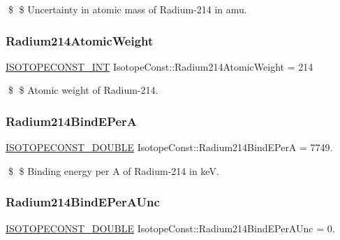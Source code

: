\$ \$ Uncertainty in atomic mass of Radium-\/214 in amu. \mbox{\label{group___isotope_const-_radium-_ra214_gaf2a700c6603025241d83a124c89c1779}} 
\subsubsection{\texorpdfstring{Radium214\+Atomic\+Weight}{Radium214AtomicWeight}}
{\footnotesize\ttfamily \mbox{\hyperlink{group___isotope_const-_macros_ga5f18360b3e99483a35c32d789e62621c}{I\+S\+O\+T\+O\+P\+E\+C\+O\+N\+S\+T\+\_\+\+I\+NT}} Isotope\+Const\+::\+Radium214\+Atomic\+Weight = 214}

\$ \$ Atomic weight of Radium-\/214. \mbox{\label{group___isotope_const-_radium-_ra214_gac9b581d3c4bf30c4f9dee54463287f96}} 
\subsubsection{\texorpdfstring{Radium214\+Bind\+E\+PerA}{Radium214BindEPerA}}
{\footnotesize\ttfamily \mbox{\hyperlink{group___isotope_const-_macros_ga8f45a7272ce02c0b4c65c44636ed719a}{I\+S\+O\+T\+O\+P\+E\+C\+O\+N\+S\+T\+\_\+\+D\+O\+U\+B\+LE}} Isotope\+Const\+::\+Radium214\+Bind\+E\+PerA = 7749.}

\$ \$ Binding energy per A of Radium-\/214 in keV. \mbox{\label{group___isotope_const-_radium-_ra214_gad258f7319f2012a423c6012f490d6af1}} 
\subsubsection{\texorpdfstring{Radium214\+Bind\+E\+Per\+A\+Unc}{Radium214BindEPerAUnc}}
{\footnotesize\ttfamily \mbox{\hyperlink{group___isotope_const-_macros_ga8f45a7272ce02c0b4c65c44636ed719a}{I\+S\+O\+T\+O\+P\+E\+C\+O\+N\+S\+T\+\_\+\+D\+O\+U\+B\+LE}} Isotope\+Const\+::\+Radium214\+Bind\+E\+Per\+A\+Unc = 0.}

